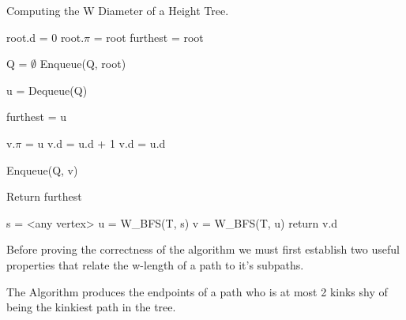\begin{algorithm}
\caption{Computing the W Diameter of a Height Tree.}

\begin{algorithmic}[1]

    \State root.d = 0
    \State root.$\pi$ = root
    \State furthest = root

    \State Q = $\emptyset$
    \State Enqueue(Q, root)

        \State u = Dequeue(Q)

            \State furthest = u
        \EndIf

                \State v.$\pi$ = u
                    \State v.d = u.d + 1
                \Else
                    \State v.d = u.d
                \EndIf

                \State Enqueue(Q, v)

            \EndIf
        \EndFor
    \EndWhile
    \State Return furthest
\EndFunction

    \State s = <any vertex>
    \State u = W\_BFS(T, s)
    \State v = W\_BFS(T, u)
    \State return v.d
\EndFunction

\end{algorithmic}
\end{algorithm}

Before proving the correctness of the algorithm we must first establish two useful properties that relate the w-length of a path to it's subpaths.


\begin{lem} The Algorithm produces the endpoints of a path who is at most 2 kinks shy of being the kinkiest path in the tree. \end{lem}


